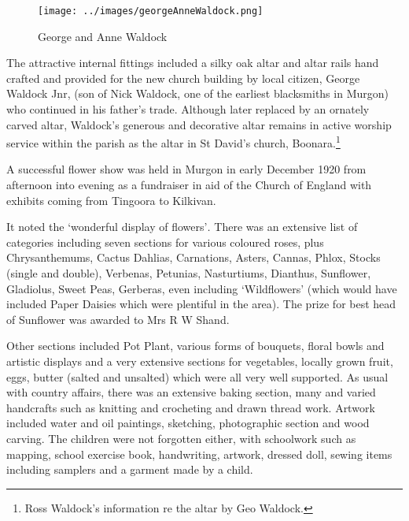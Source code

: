 \begin{figure}
\begin{center}
\texttt{[image: ../images/georgeAnneWaldock.png]}
\caption{George and Anne Waldock}
\end{center}
\end{figure}




The attractive internal fittings included a silky oak altar and altar rails hand crafted and provided for the new church building by local citizen, George Waldock Jnr, (son of Nick Waldock, one of the earliest blacksmiths in Murgon) who continued in his father's trade. Although later replaced by an ornately carved altar, Waldock's generous and decorative altar remains in active worship service within the parish as the altar in St David's church, Boonara.\footnote{Ross Waldock's information re the altar by Geo Waldock.}


A successful flower show was held in Murgon in early December 1920 from afternoon into evening as a fundraiser in aid of the Church of England with exhibits coming from Tingoora to Kilkivan.



It noted the `wonderful display of flowers'\emph{.} There was an extensive list of categories including seven sections for various coloured roses, plus Chrysanthemums, Cactus Dahlias, Carnations, Asters, Cannas, Phlox, Stocks (single and double), Verbenas, Petunias, Nasturtiums, Dianthus, Sunflower, Gladiolus, Sweet Peas, Gerberas, even including `Wildflowers' (which would have included Paper Daisies which were plentiful in the area). The prize for best head of Sunflower was awarded to Mrs R W Shand.



Other sections included Pot Plant, various forms of bouquets, floral bowls and artistic displays and a very extensive sections for vegetables, locally grown fruit, eggs, butter (salted and unsalted) which were all very well supported. As usual with country affairs, there was an extensive baking section, many and varied handcrafts such as knitting and crocheting and drawn thread work. Artwork included water and oil paintings, sketching, photographic section and wood carving. The children were not forgotten either, with schoolwork such as mapping, school exercise book, handwriting, artwork, dressed doll, sewing items including samplers and a garment made by a child.



